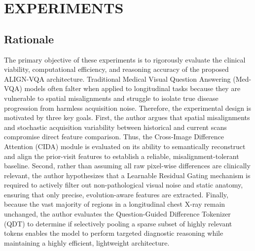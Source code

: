 \setlength{\footskip}{8mm}

\chapter{EXPERIMENTS}


\section{Rationale}
The primary objective of these experiments is to rigorously evaluate the clinical viability, computational efficiency, and reasoning accuracy of the proposed ALIGN-VQA architecture. Traditional Medical Visual Question Answering (Med-VQA) models often falter when applied to longitudinal tasks because they are vulnerable to spatial misalignments and struggle to isolate true disease progression from harmless acquisition noise. Therefore, the experimental design is motivated by three key goals. First, the author argues that spatial misalignments and stochastic acquisition variability between historical and current scans compromise direct feature comparison. Thus, the Cross-Image Difference Attention (CIDA) module is evaluated on its ability to semantically reconstruct and align the prior-visit features to establish a reliable, misalignment-tolerant baseline. Second, rather than assuming all raw pixel-wise differences are clinically relevant, the author hypothesizes that a Learnable Residual Gating mechanism is required to actively filter out non-pathological visual noise and static anatomy, ensuring that only precise, evolution-aware features are extracted. Finally, because the vast majority of regions in a longitudinal chest X-ray remain unchanged, the author evaluates the Question-Guided Difference Tokenizer (QDT) to determine if selectively pooling a sparse subset of highly relevant tokens enables the model to perform targeted diagnostic reasoning while maintaining a highly efficient, lightweight architecture.



